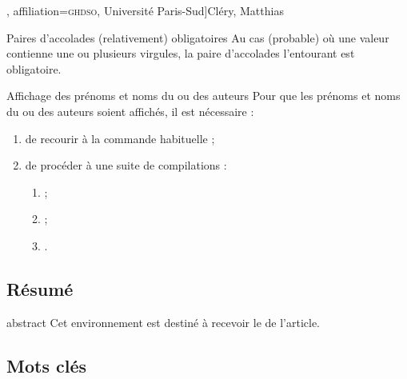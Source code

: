 \documentclass[french,nolocaltoc]{nwejmart}
\newtheorem[title=Fait,style=definition]{fact}
\begin{document}
\begin{bodycode}
\author[
  affiliation={Laboratoire \textsc{sphere}, Université Paris Diderot}
  ]{Bustamante, Martha-Cecilia}
\author[
  affiliation=[aff2]{\textsc{lpma}, Université Pierre et Marie Curie},
  affiliation={\textsc{ghdso}, Université Paris-Sud}]{Cléry, Matthias}
\author[
  affiliationtagged={aff2}
]{Mazliak, Laurent}
\end{bodycode}

\begin{dbwarning}{Paires d'accolades
    (relativement) obligatoires}{}
  Au cas (probable) où une valeur  contienne une ou plusieurs
  virgules, la paire d'accolades l'entourant est obligatoire.
\end{dbwarning}

\begin{dbwarning}{Affichage des prénoms et noms du ou des auteurs}{}
  Pour que les prénoms et noms du ou des auteurs soient affichés, il est
  nécessaire :
  \begin{enumerate}
  \item de recourir à la commande habituelle  ;
  \item de procéder à une suite de compilations\suitecompilations{} :
    \begin{enumerate}
    \item {} ;
    \item {} ;
    \item {}.
    \end{enumerate}
  \end{enumerate}
\end{dbwarning}

\subsection{Résumé}
\label{sec-resume}

\begin{docEnvironment}[doc description=\mandatory,doclang/environment content=résumé]{abstract}{}
  Cet environnement est destiné à recevoir le  de l'article.
\end{docEnvironment}

\subsection{Mots clés}
\end{document}
